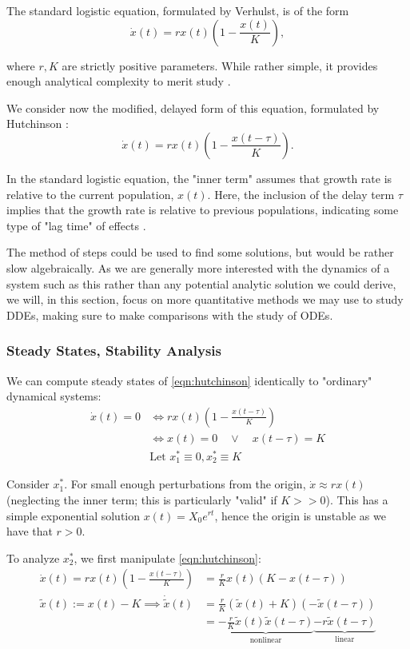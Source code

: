 \documentclass[12pt]{article}
\begin{document}
The standard logistic equation, formulated by Verhulst, is of the form \begin{equation}
    \dot{x}(t)= rx(t)\left(1 - \frac{x(t)}{K}\right),
\end{equation}

where $r, K$ are strictly positive parameters. While rather simple, it provides enough analytical complexity to merit study \cite{strogatz}.

We consider now the modified, delayed form of this equation, formulated by Hutchinson \cite{Hutchinson}:
\begin{equation}\label{eqn:hutchinson}
    \dot{x}(t) = rx(t)\left(1 - \frac{x(t - \tau)}{K}\right).
\end{equation}

In the standard logistic equation, the "inner term" assumes that growth rate is relative to the current population, $x(t)$. Here, the inclusion of the delay term $\tau$ implies that the growth rate is relative to previous populations, indicating some type of "lag time" of effects \cite{ddesinglespecies}.

The method of steps could be used to find some solutions, but would be rather slow algebraically. As we are generally more interested with the dynamics of a system such as this rather than any potential analytic solution we could derive, we will, in this section, focus on more quantitative methods we may use to study DDEs, making sure to make comparisons with the study of ODEs.
\subsubsection{Steady States, Stability Analysis}

We can compute steady states of \cref{eqn:hutchinson} identically to "ordinary" dynamical systems:
\begin{align*}
    \dot{x}(t) = 0 &\iff rx(t)\left(1 - \frac{x(t - \tau)}{K}\right)\\
    &\iff x(t) = 0 \quad \vee \quad x(t - \tau) = K\\
    &\text{Let } x^*_1 \equiv 0, x^*_2 \equiv K
\end{align*}

Consider $x^*_1$. For small enough perturbations from the origin, $\dot{x} \approx rx(t)$ (neglecting the inner term; this is particularly "valid" if $K >> 0$). This has a simple exponential solution $x(t) = X_0 e^{rt}$, hence the origin is unstable as we have that $r >0$.

To analyze $x^*_2$, we first manipulate \cref{eqn:hutchinson}:
\begin{align*}
    \dot{x}(t) = rx(t)\left(1 - \frac{x(t - \tau)}{K}\right) &= \frac{r}{K}x(t)\left(K - x(t - \tau)\right)\\
    \tilde{x}(t) := x(t) - K \implies \dot{\tilde{x}}(t) &= \frac{r}{K}(\tilde{x}(t) + K)(-\tilde{x}(t - \tau))\\
    &= \underbrace{-\frac{r}{K}\tilde{x}(t)\tilde{x}(t - \tau)}_{\text{nonlinear}} \underbrace{- r \tilde{x}(t - \tau)}_{\text{linear}}
\end{align*}
\end{document}
